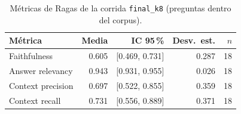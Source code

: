 \begin{table}[ht]
\centering
\begin{tabular}{lrrrr}
\toprule
Métrica & Media & IC 95\,\% & Desv.\ est. & $n$ \\
\midrule
Faithfulness & 0.605 & [0.469, 0.731] & 0.287 & 18 \\
Answer relevancy & 0.943 & [0.931, 0.955] & 0.026 & 18 \\
Context precision & 0.697 & [0.522, 0.855] & 0.359 & 18 \\
Context recall & 0.731 & [0.556, 0.889] & 0.371 & 18 \\
\bottomrule
\end{tabular}
\caption{Métricas de Ragas de la corrida \texttt{final\_k8} (preguntas dentro del corpus).}
\label{tab:ragas-final_k8}
\end{table}